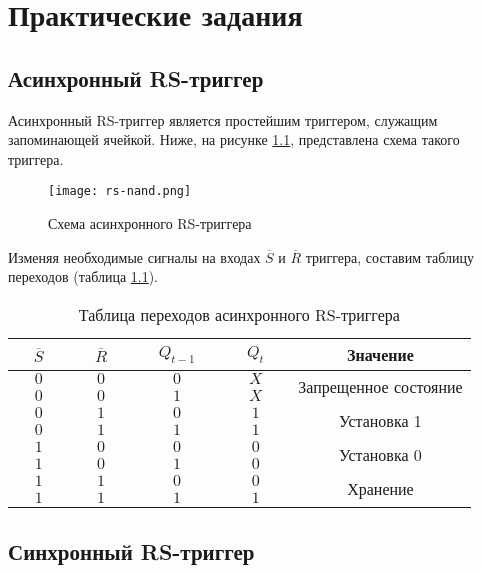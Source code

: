 \chapter{Практические задания}

\section{Асинхронный RS-триггер}

Асинхронный RS-триггер является простейшим триггером, служащим запоминающей ячейкой. Ниже, на рисунке \ref{async-rs}, представлена схема такого триггера.

\begin{figure}
	\centering
	\texttt{[image: rs-nand.png]}
	\caption{Схема асинхронного RS-триггера}
	\label{async-rs}
\end{figure}

Изменяя необходимые сигналы на входах $\overline{S}$ и $\overline{R}$ триггера, составим таблицу переходов (таблица \ref{async-rs-table}).

\begin{table}
	\centering
	\caption{Таблица переходов асинхронного RS-триггера}
	\begin{tabular}{|c|c|c|c|c|}
		\hline
		$~~~~~\overline{S}~~~~~$ & $~~~~~\overline{R}~~~~~$ & $~~~~~Q_{t-1}~~~~~$ & $~~~~~Q_t~~~~~$ & Значение \\
		\hline
		$0$ & $0$ & $0$ & $X$ &  \multirow{2}{*}{Запрещенное состояние} \\
		\cline{1-4}
		$0$ & $0$ & $1$ & $X$ & \\
		\hline
		$0$ & $1$ & $0$ & $1$ &  \multirow{2}{*}{Установка 1} \\
		\cline{1-4}
		$0$ & $1$ & $1$ & $1$ & \\
		\hline
		$1$ & $0$ & $0$ & $0$ &  \multirow{2}{*}{Установка 0} \\
		\cline{1-4}
		$1$ & $0$ & $1$ & $0$ & \\
		\hline
		$1$ & $1$ & $0$ & $0$ &  \multirow{2}{*}{Хранение} \\
		\cline{1-4}
		$1$ & $1$ & $1$ & $1$ & \\
		\hline
	\end{tabular}
	\label{async-rs-table}
\end{table}

\pagebreak

\section{Синхронный RS-триггер}

